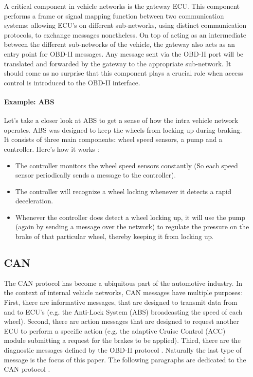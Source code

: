 A critical component in vehicle networks is the gateway ECU. This component performs a frame or signal mapping function between two communication systems; allowing ECU's on different sub-networks, using distinct communication protocols, to exchange messages nonetheless. 
On top of acting as an intermediate between the different sub-networks of the vehicle, the gateway also acts as an entry point for OBD-II messages. Any message sent via the OBD-II port will be translated and forwarded by the gateway to the appropriate sub-network. It should come as no surprise that this component plays a crucial role when access control is introduced to the OBD-II interface.

\paragraph{Example: ABS}
Let's take a closer look at ABS to get a sense of how the intra vehicle network operates. ABS was designed to keep the wheels from locking up during braking. It consists of three main components: wheel speed sensors, a pump and a controller. Here's how it works \cite{wiki:ABS}:

\begin{itemize}
	\item The controller monitors the wheel speed sensors constantly (So each speed sensor periodically sends a message to the controller).
	
	\item The controller will recognize a wheel locking whenever it detects a rapid deceleration.
	
	\item Whenever the controller does detect a wheel locking up, it will use the pump (again by sending a message over the network) to regulate the pressure on the brake of that particular wheel, thereby keeping it from locking up.
\end{itemize}

\subsection{CAN}
\label{sec:can}

The CAN protocol has become a ubiquitous part of the automotive industry. In the context of internal vehicle networks, CAN messages have multiple purposes: First, there are informative messages, that are designed to transmit data from and to ECU's (e.g. the Anti-Lock System (ABS) broadcasting the speed of each wheel). Second, there are action messages that are designed to request another ECU to perform a specific action (e.g. the adaptive Cruise Control (ACC) module submitting a request for the brakes to be applied). Third, there are the diagnostic messages defined by the OBD-II protocol \cite{MillerB}. Naturally the last type of message is the focus of this paper. The following paragraphs are dedicated to the CAN protocol \cite{wiki:CAN,ISO11898-1}.

